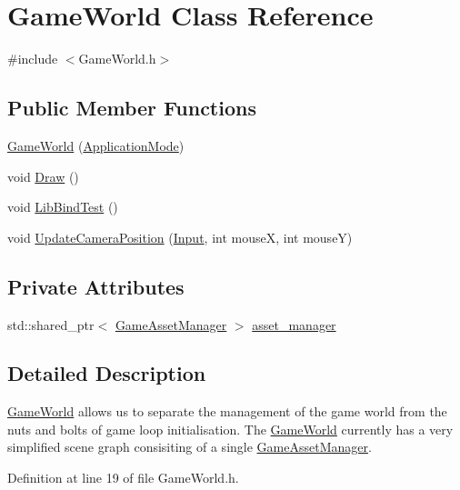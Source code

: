 \hypertarget{class_game_world}{}\section{Game\+World Class Reference}
\label{class_game_world}


{\ttfamily \#include $<$Game\+World.\+h$>$}

\subsection*{Public Member Functions}
\begin{DoxyCompactItemize}
\item 
\hyperlink{class_game_world_a17a84e57a80600961088afc753036f89}{Game\+World} (\hyperlink{common_8h_add86e7c88dd109abea3f708b422f31f0}{Application\+Mode})
\item 
void \hyperlink{class_game_world_a275418607d8286979b276f165ad5876b}{Draw} ()
\item 
void \hyperlink{class_game_world_a0a602674c208799fdb4068f1ba8dad03}{Lib\+Bind\+Test} ()
\item 
void \hyperlink{class_game_world_aa934714929b8b3bcf322f1ec4695d75b}{Update\+Camera\+Position} (\hyperlink{common_8h_a080a822f0093973313bd644e517a5090}{Input}, int mouse\+X, int mouse\+Y)
\end{DoxyCompactItemize}
\subsection*{Private Attributes}
\begin{DoxyCompactItemize}
\item 
std\+::shared\+\_\+ptr$<$ \hyperlink{class_game_asset_manager}{Game\+Asset\+Manager} $>$ \hyperlink{class_game_world_aec5c0bca4fb5a41e4aac2dce2871266d}{asset\+\_\+manager}
\end{DoxyCompactItemize}


\subsection{Detailed Description}
\hyperlink{class_game_world}{Game\+World} allows us to separate the management of the game world from the nuts and bolts of game loop initialisation. The \hyperlink{class_game_world}{Game\+World} currently has a very simplified scene graph consisiting of a single \hyperlink{class_game_asset_manager}{Game\+Asset\+Manager}. 

Definition at line 19 of file Game\+World.\+h.




